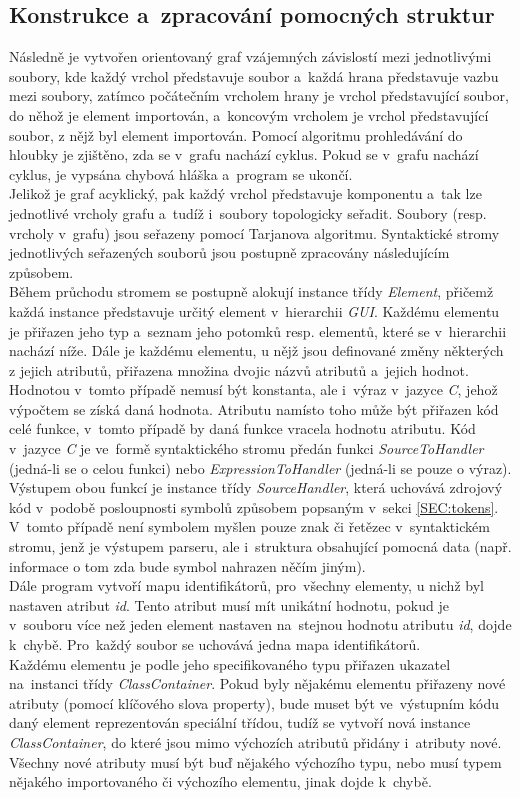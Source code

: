 \documentclass[11pt,twoside,a4paper]{book}
\begin{document}
\subsection{Konstrukce a~zpracování pomocných struktur}
Následně je vytvořen orientovaný graf vzájemných závislostí mezi jednotlivými soubory, kde každý vrchol představuje soubor a~každá hrana představuje vazbu mezi soubory, zatímco počátečním vrcholem hrany je vrchol představující soubor, do něhož je element importován, a~koncovým vrcholem je vrchol představující soubor, z nějž byl element importován. Pomocí algoritmu prohledávání do hloubky je zjištěno, zda se v~grafu nachází cyklus. Pokud se v~grafu nachází cyklus, je vypsána chybová hláška a~program se ukončí.\\
Jelikož je graf acyklický, pak každý vrchol představuje komponentu a~tak lze jednotlivé vrcholy grafu a~tudíž i~soubory topologicky seřadit. Soubory (resp. vrcholy v~grafu) jsou seřazeny pomocí Tarjanova algoritmu. Syntaktické stromy jednotlivých seřazených souborů jsou postupně zpracovány následujícím způsobem.\\
Během průchodu stromem se postupně alokují instance třídy \textit{Element}, přičemž každá instance představuje určitý element v~hierarchii \textit{GUI}. Každému elementu je přiřazen jeho typ a~seznam jeho potomků resp. elementů, které se v~hierarchii nachází níže. Dále je každému elementu, u nějž jsou definované změny některých z jejich atributů, přiřazena množina dvojic názvů atributů a~jejich hodnot. Hodnotou v~tomto případě nemusí být konstanta, ale i~výraz v~jazyce \textit{C}, jehož výpočtem se získá daná hodnota. Atributu namísto toho může být přiřazen kód celé funkce, v~tomto případě by daná funkce vracela hodnotu atributu. Kód v~jazyce \textit{C} je ve~formě syntaktického stromu předán funkci \textit{SourceToHandler} (jedná-li se o celou funkci) nebo \textit{ExpressionToHandler} (jedná-li se pouze o výraz). Výstupem obou funkcí je instance třídy \textit{SourceHandler}, která uchovává zdrojový kód v~podobě posloupnosti symbolů způsobem popsaným v~sekci \ref{SEC:tokens}. V~tomto případě není symbolem myšlen pouze znak či řetězec v~syntaktickém stromu, jenž je výstupem parseru, ale i~struktura obsahující pomocná data (např. informace o tom zda bude symbol nahrazen něčím jiným).\\
Dále program vytvoří mapu identifikátorů, pro~všechny elementy, u nichž byl nastaven atribut \textit{id}. Tento atribut musí mít unikátní hodnotu, pokud je v~souboru více než jeden element nastaven na~stejnou hodnotu atributu \textit{id}, dojde k~chybě. Pro~každý soubor se uchovává jedna mapa identifikátorů.\\
Každému elementu je podle jeho specifikovaného typu přiřazen ukazatel na~instanci třídy \textit{ClassContainer}. Pokud byly nějakému elementu přiřazeny nové atributy (pomocí klíčového slova property), bude muset být ve~výstupním kódu daný element reprezentován speciální třídou, tudíž se vytvoří nová instance \textit{ClassContainer}, do které jsou mimo výchozích atributů přidány i~atributy nové. Všechny nové atributy musí být buď nějakého výchozího typu, nebo musí typem nějakého importovaného či výchozího elementu, jinak dojde k~chybě.
\end{document}
